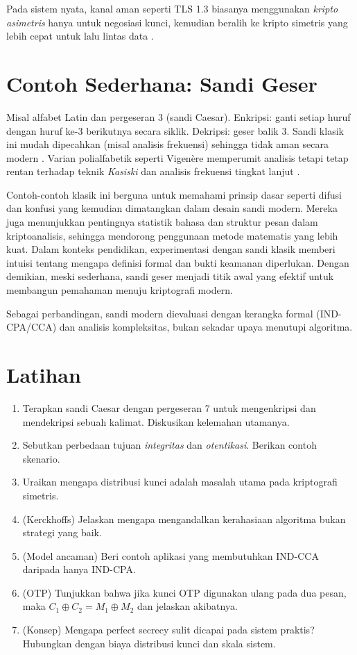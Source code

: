 \documentclass[../main.tex]{subfiles}
\begin{document}
Pada sistem nyata, kanal aman seperti TLS 1.3 biasanya menggunakan \emph{kripto asimetris} hanya untuk negosiasi kunci, kemudian beralih ke kripto simetris yang lebih cepat untuk lalu lintas data \citep{rfc8446}.

\section{Contoh Sederhana: Sandi Geser}
Misal alfabet Latin dan pergeseran 3 (sandi Caesar). Enkripsi: ganti setiap huruf dengan huruf ke-3 berikutnya secara siklik. Dekripsi: geser balik 3. Sandi klasik ini mudah dipecahkan (misal analisis frekuensi) sehingga tidak aman secara modern \citep{wikipedia_caesar}. Varian polialfabetik seperti Vigen\`{e}re memperumit analisis tetapi tetap rentan terhadap teknik \emph{Kasiski} dan analisis frekuensi tingkat lanjut \citep{wikipedia_vigenere}.

Contoh-contoh klasik ini berguna untuk memahami prinsip dasar seperti difusi dan konfusi yang kemudian dimatangkan dalam desain sandi modern. Mereka juga menunjukkan pentingnya statistik bahasa dan struktur pesan dalam kriptoanalisis, sehingga mendorong penggunaan metode matematis yang lebih kuat. Dalam konteks pendidikan, experimentasi dengan sandi klasik memberi intuisi tentang mengapa definisi formal dan bukti keamanan diperlukan. Dengan demikian, meski sederhana, sandi geser menjadi titik awal yang efektif untuk membangun pemahaman menuju kriptografi modern.

Sebagai perbandingan, sandi modern dievaluasi dengan kerangka formal (IND-CPA/CCA) dan analisis kompleksitas, bukan sekadar upaya menutupi algoritma.

\section{Latihan}
\begin{enumerate}
  \item Terapkan sandi Caesar dengan pergeseran 7 untuk mengenkripsi dan mendekripsi sebuah kalimat. Diskusikan kelemahan utamanya.
  \item Sebutkan perbedaan tujuan \emph{integritas} dan \emph{otentikasi}. Berikan contoh skenario.
  \item Uraikan mengapa distribusi kunci adalah masalah utama pada kriptografi simetris.
  \item (Kerckhoffs) Jelaskan mengapa mengandalkan kerahasiaan algoritma bukan strategi yang baik.
  \item (Model ancaman) Beri contoh aplikasi yang membutuhkan IND-CCA daripada hanya IND-CPA.
  \item (OTP) Tunjukkan bahwa jika kunci OTP digunakan ulang pada dua pesan, maka \(C_1\oplus C_2=M_1\oplus M_2\) dan jelaskan akibatnya.
  \item (Konsep) Mengapa perfect secrecy sulit dicapai pada sistem praktis? Hubungkan dengan biaya distribusi kunci dan skala sistem.
\end{enumerate}
\end{document}
